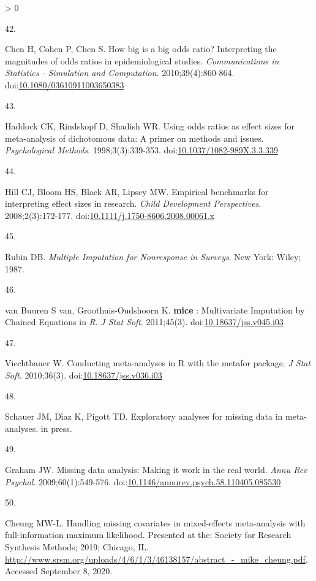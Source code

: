 \documentclass[
]{article}
\newlength{\cslhangindent}
\newlength{\csllabelwidth}
\newenvironment{CSLReferences}[2] %
 {%
  \setlength{\parindent}{0pt}
  \ifodd #1 \everypar{\setlength{\hangindent}{\cslhangindent}}\ignorespaces\fi
  \ifnum #2 > 0
  \setlength{\parskip}{#2\baselineskip}
  \fi
 }%
 {}
\newcommand{\CSLLeftMargin}[1]{\parbox[t]{\csllabelwidth}{#1}}
\newcommand{\CSLRightInline}[1]{\parbox[t]{\linewidth - \csllabelwidth}{#1}\break}
\begin{document}
\begin{CSLReferences}{0}{0}
\leavevmode\hypertarget{ref-chenHowBigBig2010}{}%
\CSLLeftMargin{42. }
\CSLRightInline{Chen H, Cohen P, Chen S. How big is a big odds ratio? Interpreting the magnitudes of odds ratios in epidemiological studies. \emph{Communications in Statistics - Simulation and Computation}. 2010;39(4):860-864. doi:\href{https://doi.org/10.1080/03610911003650383}{10.1080/03610911003650383}}

\leavevmode\hypertarget{ref-haddockUsingOddsRatios1998}{}%
\CSLLeftMargin{43. }
\CSLRightInline{Haddock CK, Rindskopf D, Shadish WR. Using odds ratios as effect sizes for meta-analysis of dichotomous data: A primer on methods and issues. \emph{Psychological Methods}. 1998;3(3):339-353. doi:\href{https://doi.org/10.1037/1082-989X.3.3.339}{10.1037/1082-989X.3.3.339}}

\leavevmode\hypertarget{ref-hillBenchmarks2008}{}%
\CSLLeftMargin{44. }
\CSLRightInline{Hill CJ, Bloom HS, Black AR, Lipsey MW. Empirical benchmarks for interpreting effect sizes in research. \emph{Child Development Perspectives}. 2008;2(3):172-177. doi:\href{https://doi.org/10.1111/j.1750-8606.2008.00061.x}{10.1111/j.1750-8606.2008.00061.x}}

\leavevmode\hypertarget{ref-rubinMultipleImputationNonresponse1987}{}%
\CSLLeftMargin{45. }
\CSLRightInline{Rubin DB. \emph{Multiple Imputation for Nonresponse in Surveys}. New York: Wiley; 1987.}

\leavevmode\hypertarget{ref-vanbuurenMiceMultivariateImputation2011}{}%
\CSLLeftMargin{46. }
\CSLRightInline{van Buuren S van, Groothuis-Oudshoorn K. \textbf{mice} : Multivariate Imputation by Chained Equations in \emph{R}. \emph{J Stat Soft}. 2011;45(3). doi:\href{https://doi.org/10.18637/jss.v045.i03}{10.18637/jss.v045.i03}}

\leavevmode\hypertarget{ref-viechtbauerConductingMetaanalysesMetafor2010}{}%
\CSLLeftMargin{47. }
\CSLRightInline{Viechtbauer W. Conducting meta-analyses in R with the metafor package. \emph{J Stat Soft}. 2010;36(3). doi:\href{https://doi.org/10.18637/jss.v036.i03}{10.18637/jss.v036.i03}}

\leavevmode\hypertarget{ref-schauerExploratoryAnalysesMissingunderreview}{}%
\CSLLeftMargin{48. }
\CSLRightInline{Schauer JM, Dìaz K, Pigott TD. Exploratory analyses for missing data in meta-analyses. in press.}

\leavevmode\hypertarget{ref-grahamMissingDataAnalysis2009}{}%
\CSLLeftMargin{49. }
\CSLRightInline{Graham JW. Missing data analysis: Making it work in the real world. \emph{Annu Rev Psychol}. 2009;60(1):549-576. doi:\href{https://doi.org/10.1146/annurev.psych.58.110405.085530}{10.1146/annurev.psych.58.110405.085530}}

\leavevmode\hypertarget{ref-cheungHandlingMissingCovariates2019}{}%
\CSLLeftMargin{50. }
\CSLRightInline{Cheung MW-L. Handling missing covariates in mixed-effects meta-analysis with full-information maximum likelihood. Presented at the: Society for Research Synthesis Methods; 2019; Chicago, IL. \url{http://www.srsm.org/uploads/4/6/1/3/46138157/abstract_-_mike_cheung.pdf}. Accessed September 8, 2020.}

\end{CSLReferences}
\end{document}
